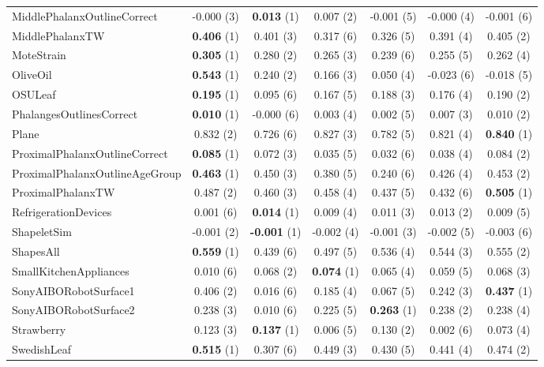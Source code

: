 \begin{table}[ht]
\begin{adjustbox}{width=\textwidth}
\begin{tabular}{lcccccc}
    MiddlePhalanxOutlineCorrect & -0.000 (3) & \textbf{0.013} (1) & 0.007 (2) & -0.001 (5) & -0.000 (4) & -0.001 (6) \\
    MiddlePhalanxTW & \textbf{0.406} (1) & 0.401 (3) & 0.317 (6) & 0.326 (5) & 0.391 (4) & 0.405 (2) \\
    MoteStrain & \textbf{0.305} (1) & 0.280 (2) & 0.265 (3) & 0.239 (6) & 0.255 (5) & 0.262 (4) \\
    OliveOil & \textbf{0.543} (1) & 0.240 (2) & 0.166 (3) & 0.050 (4) & -0.023 (6) & -0.018 (5) \\
    OSULeaf & \textbf{0.195} (1) & 0.095 (6) & 0.167 (5) & 0.188 (3) & 0.176 (4) & 0.190 (2) \\
    PhalangesOutlinesCorrect & \textbf{0.010} (1) & -0.000 (6) & 0.003 (4) & 0.002 (5) & 0.007 (3) & 0.010 (2) \\
    Plane & 0.832 (2) & 0.726 (6) & 0.827 (3) & 0.782 (5) & 0.821 (4) & \textbf{0.840} (1) \\
    ProximalPhalanxOutlineCorrect & \textbf{0.085} (1) & 0.072 (3) & 0.035 (5) & 0.032 (6) & 0.038 (4) & 0.084 (2) \\
    ProximalPhalanxOutlineAgeGroup & \textbf{0.463} (1) & 0.450 (3) & 0.380 (5) & 0.240 (6) & 0.426 (4) & 0.453 (2) \\
    ProximalPhalanxTW & 0.487 (2) & 0.460 (3) & 0.458 (4) & 0.437 (5) & 0.432 (6) & \textbf{0.505} (1) \\
    RefrigerationDevices & 0.001 (6) & \textbf{0.014} (1) & 0.009 (4) & 0.011 (3) & 0.013 (2) & 0.009 (5) \\
    ShapeletSim & -0.001 (2) & \textbf{-0.001} (1) & -0.002 (4) & -0.001 (3) & -0.002 (5) & -0.003 (6) \\
    ShapesAll & \textbf{0.559} (1) & 0.439 (6) & 0.497 (5) & 0.536 (4) & 0.544 (3) & 0.555 (2) \\
    SmallKitchenAppliances & 0.010 (6) & 0.068 (2) & \textbf{0.074} (1) & 0.065 (4) & 0.059 (5) & 0.068 (3) \\
    SonyAIBORobotSurface1 & 0.406 (2) & 0.016 (6) & 0.185 (4) & 0.067 (5) & 0.242 (3) & \textbf{0.437} (1) \\
    SonyAIBORobotSurface2 & 0.238 (3) & 0.010 (6) & 0.225 (5) & \textbf{0.263} (1) & 0.238 (2) & 0.238 (4) \\
    Strawberry & 0.123 (3) & \textbf{0.137} (1) & 0.006 (5) & 0.130 (2) & 0.002 (6) & 0.073 (4) \\
    SwedishLeaf & \textbf{0.515} (1) & 0.307 (6) & 0.449 (3) & 0.430 (5) & 0.441 (4) & 0.474 (2) \\

\end{tabular}
\end{adjustbox}
\end{table}
